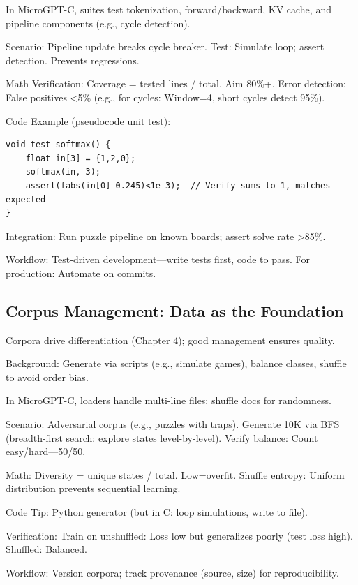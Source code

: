 \documentclass[
]{article}
\begin{document}
In MicroGPT-C, suites test tokenization, forward/backward, KV cache, and
pipeline components (e.g., cycle detection).

Scenario: Pipeline update breaks cycle breaker. Test: Simulate loop;
assert detection. Prevents regressions.

Math Verification: Coverage = tested lines / total. Aim 80\%+. Error
detection: False positives \textless5\% (e.g., for cycles: Window=4,
short cycles detect 95\%).

Code Example (pseudocode unit test):

\begin{verbatim}
void test_softmax() {
    float in[3] = {1,2,0};
    softmax(in, 3);
    assert(fabs(in[0]-0.245)<1e-3);  // Verify sums to 1, matches expected
}
\end{verbatim}

Integration: Run puzzle pipeline on known boards; assert solve rate
\textgreater85\%.

Workflow: Test-driven development---write tests first, code to pass. For
production: Automate on commits.

\subsection{Corpus Management: Data as the
Foundation}\label{corpus-management-data-as-the-foundation}

Corpora drive differentiation (Chapter 4); good management ensures
quality.

Background: Generate via scripts (e.g., simulate games), balance
classes, shuffle to avoid order bias.

In MicroGPT-C, loaders handle multi-line files; shuffle docs for
randomness.

Scenario: Adversarial corpus (e.g., puzzles with traps). Generate 10K
via BFS (breadth-first search: explore states level-by-level). Verify
balance: Count easy/hard---50/50.

Math: Diversity = unique states / total. Low=overfit. Shuffle entropy:
Uniform distribution prevents sequential learning.

Code Tip: Python generator (but in C: loop simulations, write to file).

Verification: Train on unshuffled: Loss low but generalizes poorly (test
loss high). Shuffled: Balanced.

Workflow: Version corpora; track provenance (source, size) for
reproducibility.
\end{document}
